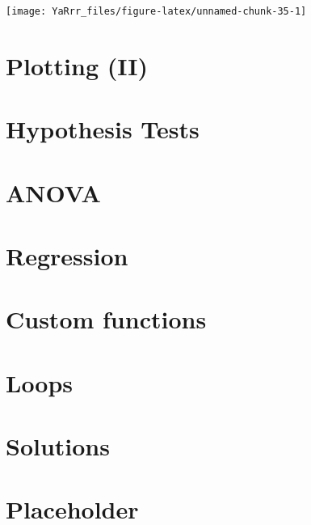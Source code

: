 \documentclass[]{book}
\theoremstyle{definition}
\theoremstyle{definition}
\theoremstyle{remark}
\begin{document}
\begin{center}\texttt{[image: YaRrr\_files/figure-latex/unnamed-chunk-35-1]} \end{center}

\chapter{Plotting (II)}\label{plotting2}

\chapter{Hypothesis Tests}\label{htests}

\chapter{ANOVA}\label{anova}

\chapter{Regression}\label{regression}

\chapter{Custom functions}\label{functions}

\chapter{Loops}\label{loops}

\chapter{Solutions}\label{solutions}

\chapter{Placeholder}\label{placeholder}


\end{document}

